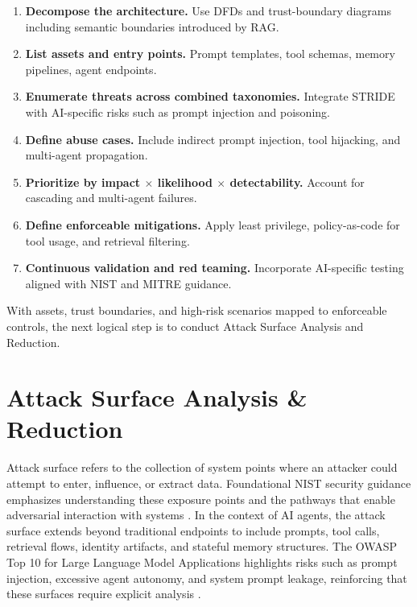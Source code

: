 \begin{TNtwocol}
\begin{enumerate}
            \item \textbf{Decompose the architecture.}
                  Use DFDs and trust-boundary diagrams including semantic boundaries introduced by RAG.\cite{OWASP_LLM_Top10}

            \item \textbf{List assets and entry points.}
                  Prompt templates, tool schemas, memory pipelines, agent endpoints.\cite{MITRE_ATLAS}

            \item \textbf{Enumerate threats across combined taxonomies.}
                  Integrate STRIDE with AI-specific risks such as prompt injection and poisoning.\cite{NIST_GenAI_Profile_600_1}

            \item \textbf{Define abuse cases.}
                  Include indirect prompt injection, tool hijacking, and multi-agent propagation.\cite{OWASP_Prompt_Injection_CS}

            \item \textbf{Prioritize by impact $\times$ likelihood $\times$ detectability.}
                  Account for cascading and multi-agent failures.\cite{MITRE_ATLAS}

            \item \textbf{Define enforceable mitigations.}
                  Apply least privilege, policy-as-code for tool usage, and retrieval filtering.\cite{NIST_SP800_207}

            \item \textbf{Continuous validation and red teaming.}
                  Incorporate AI-specific testing aligned with NIST and MITRE guidance.\cite{NIST_SP800_218}
      \end{enumerate}

      With assets, trust boundaries, and high-risk scenarios mapped to enforceable controls, the next logical step is to conduct Attack Surface Analysis and Reduction.\cite{NIST_AI_RMF_100_1,NIST_SP800_207}


      \section{Attack Surface Analysis \& Reduction}

      Attack surface refers to the collection of system points where an attacker could attempt to enter, influence, or extract data. Foundational NIST security guidance emphasizes understanding these exposure points and the pathways that enable adversarial interaction with systems \cite{NIST_SP800_12R1}. In the context of AI agents, the attack surface extends beyond traditional endpoints to include prompts, tool calls, retrieval flows, identity artifacts, and stateful memory structures. The OWASP Top 10 for Large Language Model Applications highlights risks such as prompt injection, excessive agent autonomy, and system prompt leakage, reinforcing that these surfaces require explicit analysis \cite{OWASP_LLM_Top10}.


\end{TNtwocol}
